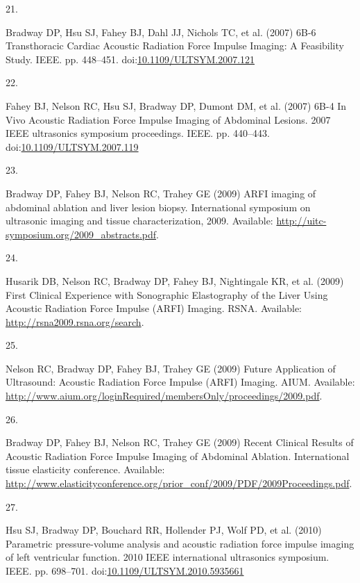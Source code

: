 \documentclass[
]{article}
\newlength{\cslhangindent}
\newlength{\csllabelwidth}
\newenvironment{CSLReferences}[2] %
 {\begin{list}{}{%
  \setlength{\itemindent}{0pt}
  \setlength{\leftmargin}{0pt}
  \setlength{\parsep}{0pt}
  \ifodd #1
   \setlength{\leftmargin}{\cslhangindent}
   \setlength{\itemindent}{-1\cslhangindent}
  \fi
  \setlength{\itemsep}{#2\baselineskip}}}
 {\end{list}}
\newcommand{\CSLLeftMargin}[1]{\parbox[t]{\csllabelwidth}{\strut#1\strut}}
\newcommand{\CSLRightInline}[1]{\parbox[t]{\linewidth - \csllabelwidth}{\strut#1\strut}}
\begin{document}
\begin{CSLReferences}{0}{1}
\CSLLeftMargin{21. }%
\CSLRightInline{Bradway DP, Hsu SJ, Fahey BJ, Dahl JJ, Nichols TC, et
al. (2007) {6B-6 Transthoracic Cardiac Acoustic Radiation Force Impulse
Imaging: A Feasibility Study}. IEEE. pp. 448--451.
doi:\href{https://doi.org/10.1109/ULTSYM.2007.121}{10.1109/ULTSYM.2007.121}}

\CSLLeftMargin{22. }%
\CSLRightInline{Fahey BJ, Nelson RC, Hsu SJ, Bradway DP, Dumont DM, et
al. (2007) {6B-4 In Vivo Acoustic Radiation Force Impulse Imaging of
Abdominal Lesions}. 2007 IEEE ultrasonics symposium proceedings. IEEE.
pp. 440--443.
doi:\href{https://doi.org/10.1109/ULTSYM.2007.119}{10.1109/ULTSYM.2007.119}}

\CSLLeftMargin{23. }%
\CSLRightInline{Bradway DP, Fahey BJ, Nelson RC, Trahey GE (2009) {ARFI
imaging of abdominal ablation and liver lesion biopsy}. International
symposium on ultrasonic imaging and tissue characterization, 2009.
Available: \url{http://uitc-symposium.org/2009_abstracts.pdf}.}

\CSLLeftMargin{24. }%
\CSLRightInline{Husarik DB, Nelson RC, Bradway DP, Fahey BJ, Nightingale
KR, et al. (2009) {First Clinical Experience with Sonographic
Elastography of the Liver Using Acoustic Radiation Force Impulse (ARFI)
Imaging}. RSNA. Available: \url{http://rsna2009.rsna.org/search}.}

\CSLLeftMargin{25. }%
\CSLRightInline{Nelson RC, Bradway DP, Fahey BJ, Trahey GE (2009)
{Future Application of Ultrasound: Acoustic Radiation Force Impulse
(ARFI) Imaging}. AIUM. Available:
\url{http://www.aium.org/loginRequired/membersOnly/proceedings/2009.pdf}.}

\CSLLeftMargin{26. }%
\CSLRightInline{Bradway DP, Fahey BJ, Nelson RC, Trahey GE (2009)
{Recent Clinical Results of Acoustic Radiation Force Impulse Imaging of
Abdominal Ablation}. International tissue elasticity conference.
Available:
\url{http://www.elasticityconference.org/prior_conf/2009/PDF/2009Proceedings.pdf}.}

\CSLLeftMargin{27. }%
\CSLRightInline{Hsu SJ, Bradway DP, Bouchard RR, Hollender PJ, Wolf PD,
et al. (2010) {Parametric pressure-volume analysis and acoustic
radiation force impulse imaging of left ventricular function}. 2010 IEEE
international ultrasonics symposium. IEEE. pp. 698--701.
doi:\href{https://doi.org/10.1109/ULTSYM.2010.5935661}{10.1109/ULTSYM.2010.5935661}}


\end{CSLReferences}
\end{document}
